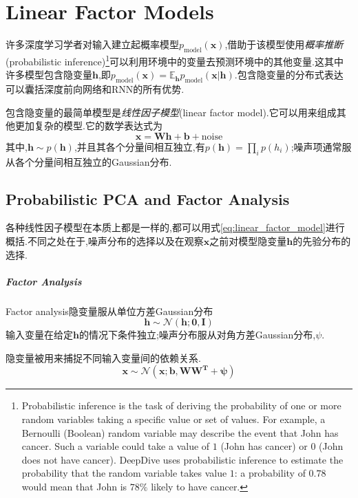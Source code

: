 \chapter{Linear Factor Models}

许多深度学习学者对输入建立起概率模型$p_{\text{model}}(\bm x)$,借助于该模型使用\textit{概率推断}(probabilistic inference)\footnote{Probabilistic inference is the task of deriving the probability of one or more random variables taking a specific value or set of values. For example, a Bernoulli (Boolean) random variable may describe the event that John has cancer. Such a variable could take a value of $1$ (John has cancer) or $0$ (John does not have cancer). DeepDive uses probabilistic inference to estimate the probability that the random variable takes value $1$: a probability of $0.78$ would mean that John is $78\%$ likely to have cancer.}可以利用环境中的变量去预测环境中的其他变量.这其中许多模型包含隐变量$\bm h$,即$p_{\text{model}}(\bm x)=\mathbb E_{\bm h}p_{\text{model}}(\bm x|\bm h)$.包含隐变量的分布式表达可以囊括深度前向网络和RNN的所有优势.

包含隐变量的最简单模型是\textit{线性因子模型}(linear factor model).它可以用来组成其他更加复杂的模型.它的数学表达式为
\begin{equation}\label{eq:linear_factor_model}
\bm x=\bm {Wh+b}+\text{noise}
\end{equation}
其中,$\bm h\sim p(\bm h)$,并且其各个分量间相互独立,有$p(\bm h)=\prod_ip(h_i)$;噪声项通常服从各个分量间相互独立的Gaussian分布.

\section{Probabilistic PCA and Factor Analysis}

各种线性因子模型在本质上都是一样的,都可以用式\ref{eq:linear_factor_model}进行概括.不同之处在于,噪声分布的选择以及在观察$\bm x$之前对模型隐变量$\bm h$的先验分布的选择.

\paragraph{Factor Analysis}

Factor analysis隐变量服从单位方差Gaussian分布
\begin{equation}
\bm h\sim\mathcal N(\bm{h;0,I})
\end{equation}
输入变量在给定$\bm h$的情况下条件独立;噪声分布服从对角方差Gaussian分布,$\psi$.

隐变量被用来捕捉不同输入变量间的依赖关系.
\begin{equation}
\bm x\sim\mathcal N(\bm{x;b,WW^T+\psi})
\end{equation}

